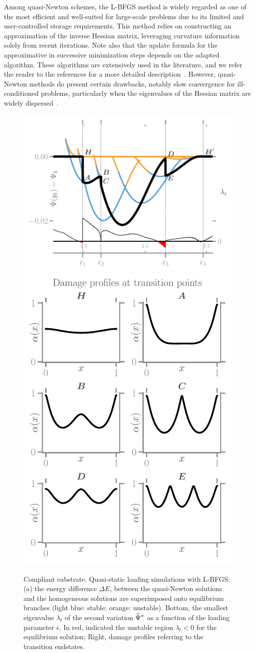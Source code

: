 Among quasi-Newton schemes, the L-BFGS method is widely regarded as one of the most efficient and well-suited for large-scale problems due to its limited and user-controlled storage requirements. This method relies on constructing an approximation of the inverse Hessian matrix, leveraging curvature information solely from recent iterations. Note also that the update formula for the approximative in successive minimization steps depends on the adapted algorithm. These algorithms are extensively used in the literature, and we refer the reader to the references for a more detailed description~\cite{Matthies1979-gl,Xu2001-ax,Nocedal1999-zr,Nocedal2006-qh,Simone2012-tx,Lewis2013-eu,Curtis2015-wp}. However, quasi-Newton methods do present certain drawbacks, notably slow convergence for ill-conditioned problems, particularly when the eigenvalues of the Hessian matrix are widely dispersed~\cite{Simone2012-tx}.
\begin{figure}
    \centering
    \hspace*{-.3cm}
    \includegraphics[width=.6\textwidth]{../images/model_compliant_energy_kick.pdf}
    \includegraphics[width=.4\textwidth]{../images/model_compliant_profiles.pdf}
    \caption{
        Compliant substrate. Quasi-static loading simulations with L-BFGS: (a) the energy difference $\Delta E$, between the quasi-Newton solutions and the homogeneous solutions are superimposed onto equilibrium branches (light blue: stable; orange: unstable). Bottom, the smallest eigenvalue $\lambda_t$ of the second variation $\widetilde\Psi''$ as a function of the loading parameter $\bar\epsilon$. In red, indicated the unstable region $\lambda_t<0$ for the equilibrium solution; Right, damage profiles referring to the transition endstates.}
    \label{fig:tempo2}
\end{figure}


